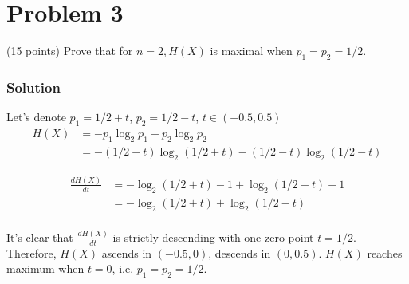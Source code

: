 \section*{Problem 3}

(15 points) Prove that for $n = 2, H(X)$ is maximal when $p_1 = p_2 = 1/2$.

\subsubsection*{Solution}

Let's denote $p_1 = 1/2 + t$, $p_2 = 1/2 - t$, $t \in (-0.5, 0.5)$
\begin{align*}
    H(X) & = -p_1 \log_2 p_1 - p_2 \log_2 p_2 \\
    & = -(1/2 + t) \log_2 (1/2 + t) - (1/2 - t) \log_2 (1/2 - t) 
\end{align*}

\begin{align*}
    \frac{dH(X)}{dt} & = -\log_2(1/2 + t) -1 + \log_2(1/2 - t) +1 \\
    & = -\log_2(1/2 + t) + \log_2(1/2 - t) \\
\end{align*}

It's clear that $\frac{dH(X)}{dt}$ is strictly descending with one zero point $t = 1/2$.
Therefore, $H(X)$ ascends in $(-0.5, 0)$, descends in $(0, 0.5)$.
$H(X)$ reaches maximum when $t = 0$, i.e. $p_1 = p_2 = 1/2$.